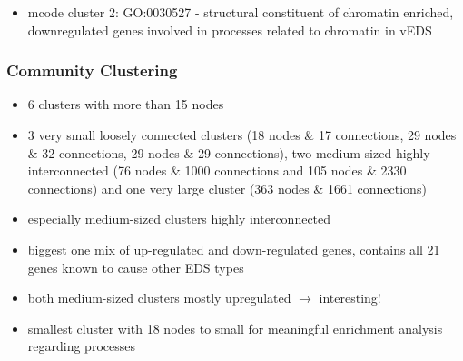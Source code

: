 \begin{itemize}
	\item mcode cluster 2: 	GO:0030527 - structural constituent of chromatin enriched, downregulated genes involved in processes related to chromatin in vEDS \cite{Chiarelli2018}
\end{itemize}

\subsubsection{Community Clustering}

\begin{itemize}
	\item 6 clusters with more than 15 nodes
	\item 3 very small loosely connected clusters (18 nodes \& 17 connections, 29 nodes \& 32 connections, 29 nodes \& 29 connections), two medium-sized highly interconnected (76 nodes \& 1000 connections and 105 nodes \& 2330 connections) and one very large cluster (363 nodes \& 1661 connections)
	\item especially medium-sized clusters highly interconnected
	\item biggest one mix of up-regulated and down-regulated genes, contains all 21 genes known to cause other EDS types
	\item both medium-sized clusters mostly upregulated $\rightarrow$ interesting!
	\item smallest cluster with 18 nodes to small for meaningful enrichment analysis regarding processes
\end{itemize}
